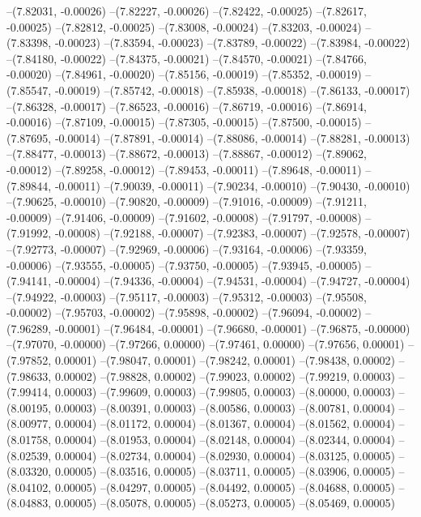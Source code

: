 --(7.82031, -0.00026)
--(7.82227, -0.00026)
--(7.82422, -0.00025)
--(7.82617, -0.00025)
--(7.82812, -0.00025)
--(7.83008, -0.00024)
--(7.83203, -0.00024)
--(7.83398, -0.00023)
--(7.83594, -0.00023)
--(7.83789, -0.00022)
--(7.83984, -0.00022)
--(7.84180, -0.00022)
--(7.84375, -0.00021)
--(7.84570, -0.00021)
--(7.84766, -0.00020)
--(7.84961, -0.00020)
--(7.85156, -0.00019)
--(7.85352, -0.00019)
--(7.85547, -0.00019)
--(7.85742, -0.00018)
--(7.85938, -0.00018)
--(7.86133, -0.00017)
--(7.86328, -0.00017)
--(7.86523, -0.00016)
--(7.86719, -0.00016)
--(7.86914, -0.00016)
--(7.87109, -0.00015)
--(7.87305, -0.00015)
--(7.87500, -0.00015)
--(7.87695, -0.00014)
--(7.87891, -0.00014)
--(7.88086, -0.00014)
--(7.88281, -0.00013)
--(7.88477, -0.00013)
--(7.88672, -0.00013)
--(7.88867, -0.00012)
--(7.89062, -0.00012)
--(7.89258, -0.00012)
--(7.89453, -0.00011)
--(7.89648, -0.00011)
--(7.89844, -0.00011)
--(7.90039, -0.00011)
--(7.90234, -0.00010)
--(7.90430, -0.00010)
--(7.90625, -0.00010)
--(7.90820, -0.00009)
--(7.91016, -0.00009)
--(7.91211, -0.00009)
--(7.91406, -0.00009)
--(7.91602, -0.00008)
--(7.91797, -0.00008)
--(7.91992, -0.00008)
--(7.92188, -0.00007)
--(7.92383, -0.00007)
--(7.92578, -0.00007)
--(7.92773, -0.00007)
--(7.92969, -0.00006)
--(7.93164, -0.00006)
--(7.93359, -0.00006)
--(7.93555, -0.00005)
--(7.93750, -0.00005)
--(7.93945, -0.00005)
--(7.94141, -0.00004)
--(7.94336, -0.00004)
--(7.94531, -0.00004)
--(7.94727, -0.00004)
--(7.94922, -0.00003)
--(7.95117, -0.00003)
--(7.95312, -0.00003)
--(7.95508, -0.00002)
--(7.95703, -0.00002)
--(7.95898, -0.00002)
--(7.96094, -0.00002)
--(7.96289, -0.00001)
--(7.96484, -0.00001)
--(7.96680, -0.00001)
--(7.96875, -0.00000)
--(7.97070, -0.00000)
--(7.97266, 0.00000)
--(7.97461, 0.00000)
--(7.97656, 0.00001)
--(7.97852, 0.00001)
--(7.98047, 0.00001)
--(7.98242, 0.00001)
--(7.98438, 0.00002)
--(7.98633, 0.00002)
--(7.98828, 0.00002)
--(7.99023, 0.00002)
--(7.99219, 0.00003)
--(7.99414, 0.00003)
--(7.99609, 0.00003)
--(7.99805, 0.00003)
--(8.00000, 0.00003)
--(8.00195, 0.00003)
--(8.00391, 0.00003)
--(8.00586, 0.00003)
--(8.00781, 0.00004)
--(8.00977, 0.00004)
--(8.01172, 0.00004)
--(8.01367, 0.00004)
--(8.01562, 0.00004)
--(8.01758, 0.00004)
--(8.01953, 0.00004)
--(8.02148, 0.00004)
--(8.02344, 0.00004)
--(8.02539, 0.00004)
--(8.02734, 0.00004)
--(8.02930, 0.00004)
--(8.03125, 0.00005)
--(8.03320, 0.00005)
--(8.03516, 0.00005)
--(8.03711, 0.00005)
--(8.03906, 0.00005)
--(8.04102, 0.00005)
--(8.04297, 0.00005)
--(8.04492, 0.00005)
--(8.04688, 0.00005)
--(8.04883, 0.00005)
--(8.05078, 0.00005)
--(8.05273, 0.00005)
--(8.05469, 0.00005)
